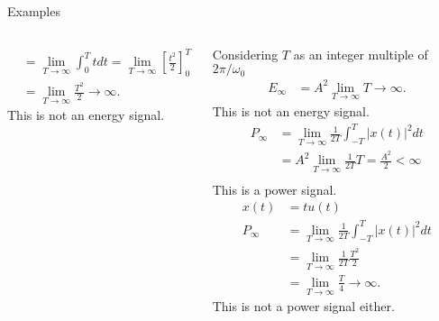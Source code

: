\begin{frame}{Examples}
\begin{columns}[t]
\begin{column}{0.5\textwidth}
\begin{overprint}
\begin{align*}
                    &= \lim_{T\rightarrow \infty}\int_{0}^{T} tdt
                    = \lim_{T\rightarrow \infty} \left[\frac{t^2}{2}\right]_0^T\\
                    &= \lim_{T\rightarrow \infty}\frac{T^2}{2} \rightarrow \infty.
                \end{align*}
                This is not an energy signal.
            \end{overprint}
        \end{column}
        \begin{column}{0.5\textwidth}
            \begin{overprint}
                Considering $T$ as an integer multiple of $2\pi/\omega_0$
                \begin{align*}
                    E_\infty &= A^2\lim_{T\rightarrow \infty}T \rightarrow \infty.
                \end{align*}
                This is not an energy signal.
                \begin{align*}
                    P_\infty &= \lim_{T\rightarrow \infty} \frac{1}{2T}\int_{-T}^{T}|x(t)|^2dt\\
                    &= A^2\lim_{T\rightarrow \infty}\frac{1}{2T}T  = \frac{A^2}{2} < \infty\\
                \end{align*}
                This is a power signal.
                \begin{align*}
                    x(t) &= tu(t)\\
                    P_\infty &=  \lim_{T\rightarrow \infty}\frac{1}{2T}\int_{-T}^{T}|x(t)|^2dt\\
                    &= \lim_{T\rightarrow \infty}\frac{1}{2T}\frac{T^2}{2}\\
                    &= \lim_{T\rightarrow \infty}\frac{T}{4} \rightarrow \infty.
                \end{align*}
                This is not a power signal either.
            \end{overprint}
        \end{column}
    \end{columns}
\end{frame} 


